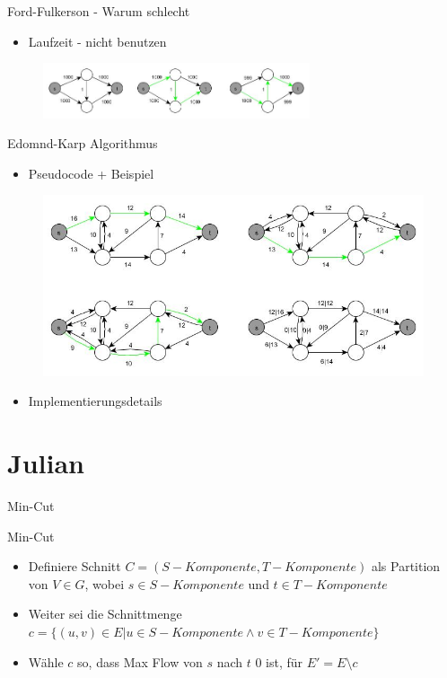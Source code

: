\documentclass[18pt]{beamer}
\begin{document}
\begin{frame}{Ford-Fulkerson - Warum schlecht}
\begin{itemize}
\item Laufzeit - nicht benutzen
\end{itemize}
\begin{figure}
\includegraphics[width = 0.7\textwidth]{img/Jakob_Ford2.jpg}
\end{figure}
\end{frame}


\begin{frame}{Edomnd-Karp Algorithmus}
\begin{itemize}
\item Pseudocode + Beispiel
\end{itemize}
\begin{figure}
\includegraphics[width = \textwidth]{img/Jakob_Edmond.jpg}
\end{figure}

\begin{itemize}
\item Implementierungsdetails
\end{itemize}
\end{frame}


\section{Julian}
\begin{frame}{Min-Cut}
\begin{block}{Min-Cut}

\begin{itemize}
\item Definiere Schnitt \(C = (S-Komponente, T-Komponente)\) als Partition von \(V \in G \), wobei \(s \in S-Komponente\) und \(t \in T-Komponente\) 
\item Weiter sei die Schnittmenge \(c = \{(u, v) \in E | u \in S-Komponente \land v \in T-Komponente\}\)
\item W\"ahle \(c\) so, dass Max Flow von \(s\) nach \(t\) 0 ist, f\"ur \(E'=E\setminus c\) 
\end{itemize}
\end{block}
\end{frame}
\end{document}
